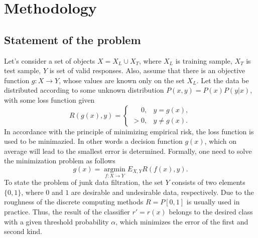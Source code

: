 \documentclass[12pt]{jpconf}
\begin{document}
\section{Methodology}
\subsection{Statement of the problem}
Let's consider a set of objects $ X = X_L \cup X_T$, where
$X_L$ is training sample,
$X_T$ is test sample,
$Y$ is set of valid responses. Also, assume that there is an objective function $g: X \rightarrow Y$, whose values are known only on the set $X_L$. Let the data be distributed according to some unknown distribution $P (x,y) = P(x) P (y|x)$, with some loss function given
$$
R(g(x), y) = 
\begin{cases} 
\phantom{>}0, & y = g(x), \\
> 0, & y \neq g(x).
\end{cases}
$$
In accordance with the principle of minimizing empirical risk, the loss function is used to be minimazied. In other words a decision function $g(x)$, which on average will lead to the smallest error is determined. Formally, one need to solve the minimization problem as follows
$$
g(x) = \operatorname*{argmin}_{f: X \rightarrow Y} E_{X,Y} R(f(x), y).
$$
To state the problem of junk data filtration, the set $Y$ consists of two elements $\{0, 1\}$, where $0$ and $1$ are desirable and undesirable data, respectively. Due to the roughness of the discrete computing methods $R = P[0, 1]$ is usually used in practice. Thus, the result of the classifier $r' = r(x)$ belongs to the desired class with a given threshold probability $\alpha$, which minimizes the error of the first and second kind.
\end{document}
